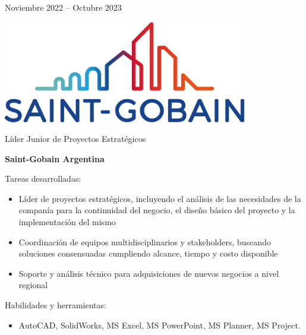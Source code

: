 \documentclass[a4paper,10pt]{article}
\newlength{\cvcolumngapwidth}
\newlength{\cvleftcolumnwidth}
\newlength{\cvrightcolumnwidth}
\newcommand{\cvtitlestyle}[1]{{\large\cvtitlefont\textcolor{cvtitlecolor}{#1}}}
\newcommand{\cvdurationstyle}[1]{{\small\cvdurationfont\textcolor{cvdurationcolor}{#1}}}
\newlength{\cvafteritemskipamount}
\newlength{\cvaftertitleskipamount}
\newlength{\cvparskip}
\newcommand{\cvitem}[2]{
    \begin{minipage}[t]{\cvleftcolumnwidth}
        \raggedleft #1
    \end{minipage}%
    \hspace{\cvcolumngapwidth}%
    \begin{minipage}[t]{\cvrightcolumnwidth}
        \setlength{\parskip}{\cvparskip} #2
    \end{minipage}

    \vspace{\cvafteritemskipamount}
}
\newcommand{\cvtitle}[1]{
    \cvtitlestyle{#1}

    \vspace{\cvaftertitleskipamount}
    \vspace{-\cvparskip}
}
\begin{document}
\cvitem{
    \cvdurationstyle{Noviembre 2022 -- Octubre 2023}
}{
    \begin{minipage}{0.1\textwidth}
        \centering
        \includegraphics[width=0.8\textwidth]{../logos-photos/Logo_SG.png}   
    \end{minipage}
    \cvtitle{Líder Junior de Proyectos Estratégicos}

    \textbf{Saint-Gobain Argentina}
	
	Tareas desarrolladas:
    \begin{itemize}
        \item Líder de proyectos estratégicos, incluyendo el análisis de las necesidades de la companía para la continuidad del negocio, el diseño básico del proyecto y la implementación del mismo
        \item Coordinación de equipos multidisciplinarios y stakeholders, buscando soluciones consensuadas cumpliendo alcance, tiempo y costo disponible
        \item Soporte y análisis técnico para adquisiciones de nuevos negocios a nivel regional
    \end{itemize}
	
	Habilidades y herramientas:
	\begin{itemize}
		\item AutoCAD, SolidWorks, MS Excel, MS PowerPoint, MS Planner, MS Project.
	\end{itemize}

}
\end{document}
